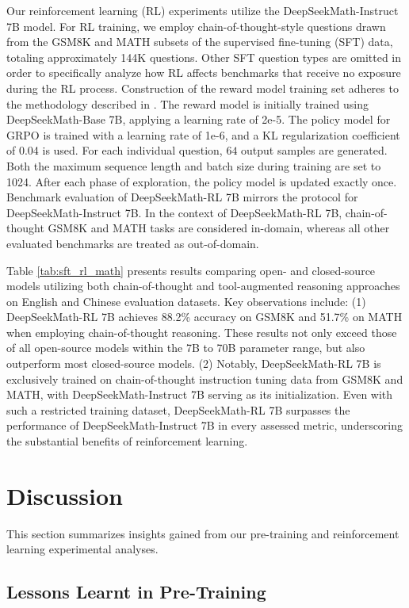 \begin{itemize}[topsep=0pt]
Our reinforcement learning (RL) experiments utilize the DeepSeekMath-Instruct 7B model. For RL training, we employ chain-of-thought-style questions drawn from the GSM8K and MATH subsets of the supervised fine-tuning (SFT) data, totaling approximately 144K questions. Other SFT question types are omitted in order to specifically analyze how RL affects benchmarks that receive no exposure during the RL process. Construction of the reward model training set adheres to the methodology described in \citep{wang2023math}. The reward model is initially trained using DeepSeekMath-Base 7B, applying a learning rate of 2e-5. The policy model for GRPO is trained with a learning rate of 1e-6, and a KL regularization coefficient of 0.04 is used. For each individual question, $64$ output samples are generated. Both the maximum sequence length and batch size during training are set to 1024. After each phase of exploration, the policy model is updated exactly once. Benchmark evaluation of DeepSeekMath-RL 7B mirrors the protocol for DeepSeekMath-Instruct 7B. In the context of DeepSeekMath-RL 7B, chain-of-thought GSM8K and MATH tasks are considered in-domain, whereas all other evaluated benchmarks are treated as out-of-domain.

Table \ref{tab:sft_rl_math} presents results comparing open- and closed-source models utilizing both chain-of-thought and tool-augmented reasoning approaches on English and Chinese evaluation datasets. Key observations include: (1) DeepSeekMath-RL 7B achieves 88.2\% accuracy on GSM8K and 51.7\% on MATH when employing chain-of-thought reasoning. These results not only exceed those of all open-source models within the 7B to 70B parameter range, but also outperform most closed-source models. (2) Notably, DeepSeekMath-RL 7B is exclusively trained on chain-of-thought instruction tuning data from GSM8K and MATH, with DeepSeekMath-Instruct 7B serving as its initialization. Even with such a restricted training dataset, DeepSeekMath-RL 7B surpasses the performance of DeepSeekMath-Instruct 7B in every assessed metric, underscoring the substantial benefits of reinforcement learning.

\section{Discussion}
This section summarizes insights gained from our pre-training and reinforcement learning experimental analyses.

\subsection{Lessons Learnt in Pre-Training}


\end{itemize}
